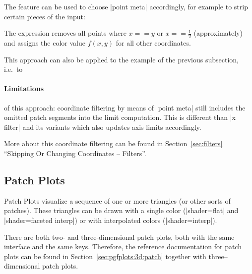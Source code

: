 {The feature can be used to choose |point meta| accordingly, for example to strip certain pieces of the input:
\begin{codeexample}[]
\end{codeexample}
The expression removes all points where $x == y$ or $x==\frac12$ (approximately) and assigns the color value $f(x,y)$ for all other coordinates.

This approach can also be applied to the example of the previous subsection, i.e.\ to 
\begin{codeexample}[]
\end{codeexample}

\paragraph{Limitations} of this approach: coordinate filtering by means of |point meta| still includes the omitted patch segments into the limit computation. This is different than |x filter| and its variants which also updates axis limits accordingly.


More about this coordinate filtering can be found in Section~\ref{sec:filters} ``Skipping Or Changing Coordinates -- Filters''.

\subsection{Patch Plots}
Patch Plots visualize a sequence of one or more triangles (or other sorts of patches). These triangles can be drawn with a single color (|shader=flat| and |shader=faceted interp|) or with interpolated colors (|shader=interp|).

There are both two- and three-dimensional patch plots, both with the same interface and the same keys. Therefore, the reference documentation for patch plots can be found in Section~\ref{sec:pgfplots:3d:patch} together with three--dimensional patch plots.

}

